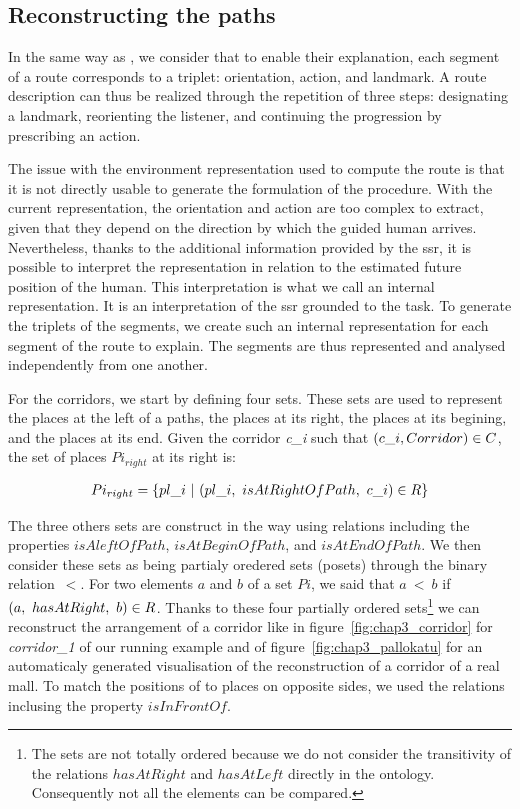 \subsection{Reconstructing the paths}

In the same way as \cite{tversky_1999_pictorial}, we consider that to enable their explanation, each segment of a route corresponds to a triplet: orientation, action, and landmark. A route description can thus be realized through the repetition of three steps: designating a landmark, reorienting the listener, and continuing the progression by prescribing an action.

The issue with the environment representation used to compute the route is that it is not directly usable to generate the formulation of the procedure. With the current representation, the orientation and action are too complex to extract, given that they depend on the direction by which the guided human arrives. Nevertheless, thanks to the additional information provided by the \acrlong{ssr}, it is possible to interpret the representation in relation to the estimated future position of the human. This interpretation is what we call an internal representation. It is an interpretation of the \acrshort{ssr} grounded to the task. To generate the triplets of the segments, we create such an internal representation for each segment of the route to explain. The segments are thus represented and analysed independently from one another.

For the corridors, we start by defining four sets. These sets are used to represent the places at the left of a paths, the places at its right, the places at its begining, and the places at its end. Given the corridor \textit{c\_i} such that $(c\_i, Corridor) \in C$, the set of places $Pi_{right}$ at its right is:

\begin{gather*}
Pi_{right} = \{ pl\_i\ |\ (pl\_i,\ isAtRightOfPath,\ c\_i) \in R \}
\end{gather*}

The three others sets are construct in the way using relations including the properties $isAleftOfPath$, $isAtBeginOfPath$, and $isAtEndOfPath$. We then consider these sets as being partialy oredered sets (posets) through the binary relation~$<$. For two elements $a$ and $b$ of a set $Pi$, we said that $a\ <\ b$ if $(a,\ hasAtRight,\ b) \in R$. Thanks to these four partially ordered sets\footnote{The sets are not totally ordered because we do not consider the transitivity of the relations $hasAtRight$ and $hasAtLeft$ directly in the ontology. Consequently not all the elements can be compared.} we can reconstruct the arrangement of a corridor like in figure~\ref{fig:chap3_corridor} for \textit{corridor\_1} of our running example and of figure~\ref{fig:chap3_pallokatu} for an automaticaly generated visualisation of the reconstruction of a corridor of a real mall. To match the positions of to places on opposite sides, we used the relations inclusing the property $isInFrontOf$.

